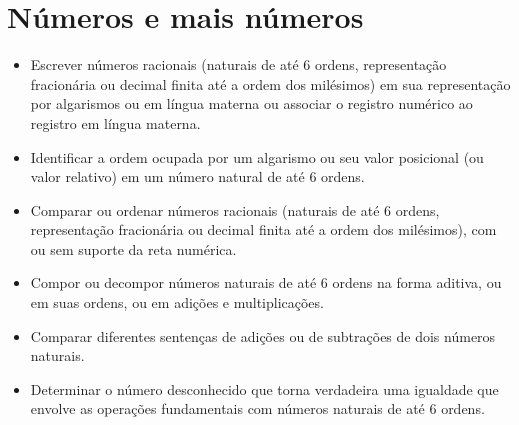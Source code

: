 \pagestyle{mat}
\chapter{Números e mais números}



\begin{itemize}
\item Escrever números racionais (naturais de até 6 ordens, representação
fracionária ou decimal finita até a ordem dos milésimos) em sua
representação por algarismos ou em língua materna ou associar o registro
numérico ao registro em língua materna.

\item Identificar a ordem ocupada por um algarismo ou seu valor posicional
(ou valor relativo) em um número natural de até 6 ordens.

\item Comparar ou ordenar números racionais (naturais de até 6 ordens,
representação fracionária ou decimal finita até a ordem dos milésimos),
com ou sem suporte da reta numérica.

\item Compor ou decompor números naturais de até 6 ordens na forma aditiva,
ou em suas ordens, ou em adições e multiplicações.

\item Comparar diferentes sentenças de adições ou de subtrações de dois números naturais.

\item Determinar o número desconhecido que torna verdadeira uma igualdade
que envolve as operações fundamentais com números naturais de até 6
ordens.
\end{itemize}


